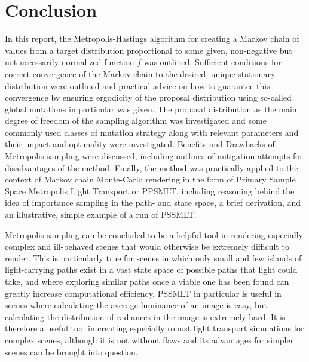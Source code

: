 \documentclass[oneside, a4paper]{article}
\begin{document}
\section{Conclusion}
In this report, the Metropolis-Hastings algorithm for creating a Markov chain  of values from a target distribution proportional to some given, non-negative but not necessarily normalized function $f$ was outlined. Sufficient conditions for correct convergence of the Markov chain to the desired, unique stationary distribution were outlined and practical advice on how to guarantee this convergence by ensuring ergodicity of the proposal distribution using so-called global mutations in particular was given. The proposal distribution as the main degree of freedom of the sampling algorithm was investigated and some commonly used classes of mutation strategy along with relevant parameters and their impact and optimality were investigated. Benefits and Drawbacks of Metropolis sampling were discussed, including outlines of mitigation attempts for disadvantages of the method. Finally, the method was practically applied to the context of Markov chain Monte-Carlo rendering in the form of Primary Sample Space Metropolis Light Transport or PPSMLT, including reasoning behind the idea of importance sampling in the path- and state space, a brief derivation, and an illustrative, simple example of a run of PSSMLT.

Metropolis sampling can be concluded to be a helpful tool in rendering especially complex and ill-behaved scenes that would otherwise be extremely difficult to render. This is particularly true for scenes in which only small and few islands of light-carrying paths exist in a vast state space of possible paths that light could take, and where exploring similar paths once a viable one has been found can greatly increase computational efficiency. PSSMLT in particular is useful in scenes where calculating the average luminance of an image is easy, but calculating the distribution of radiances in the image is extremely hard. It is therefore a useful tool in creating especially robust light transport simulations for complex scenes, although it is not without flaws and its advantages for simpler scenes can be brought into question.


\newpage
\printbibliography[
  heading=bibintoc,
  title={Bibliography}
]
\end{document}
